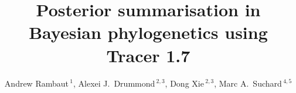 \documentclass{bioinfo}
\begin{document}

\title[Tracer 1.7]{Posterior summarisation in Bayesian phylogenetics using Tracer 1.7}

\author[Rambaut \textit{et~al}]{ Andrew Rambaut\,$^{1}$, Alexei J.~Drummond\,$^{2,3}$, Dong Xie\,$^{2,3}$, Marc A.~Suchard\,$^{4,5}$}

\address{
$^{1}$Institute of Evolutionary Biology, University of Edinburgh, Edinburgh, UK\\
$^{2}$Department of Computer Science, University of Auckland, Auckland, NZ\\
$^{3}$Centre for Computational Evolution, University of Auckland, Auckland, NZ\\
$^{4}$Departments of Biomathematics and Human Genetics, David Geffen School of Medicine, UCLA, and \\
$^{5}$Department of Biostatistics, UCLA Fielding School of Public Health, University of California, Los Angeles, USA \\
}



\maketitle
\end{document}
